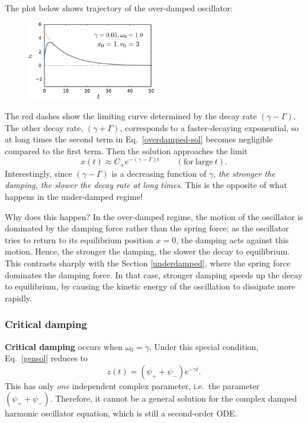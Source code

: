 \documentclass[10pt,a4paper]{article}
\begin{document}
\clearpage
The plot below shows trajectory of the over-damped oscillator:

\begin{figure}[ht]
  \centering\includegraphics[width=0.5\textwidth]{overdamped}
\end{figure}

\noindent
The red dashes show the limiting curve determined by the decay rate
$(\gamma - \Gamma)$.  The other decay rate, $(\gamma + \Gamma)$,
corresponds to a faster-decaying exponential, so at long times the
second term in Eq.~\eqref{overdamped-sol} becomes negligible compared
to the first term. Then the solution approaches the limit
\begin{equation}
x(t) \approx C_+ e^{-(\gamma - \Gamma) t} \qquad (\mathrm{for}~\mathrm{large}~t).
\label{overdamped-long-t}
\end{equation}
Interestingly, since $(\gamma-\Gamma)$ is a decreasing function of
$\gamma$, \emph{the stronger the damping, the slower the decay rate at
  long times}. This is the opposite of what happens in the
under-damped regime!

Why does this happen? In the over-damped regime, the motion of the
oscillator is dominated by the damping force rather than the spring
force; as the oscillator tries to return to its equilibrium position
$x = 0$, the damping acts against this motion. Hence, the stronger the
damping, the slower the decay to equilibrium. This contrasts sharply
with the Section \ref{underdamped}, where the spring force dominates the
damping force. In that case, stronger damping speeds up the decay to
equilibrium, by causing the kinetic energy of the oscillation to
dissipate more rapidly.

\subsubsection{Critical damping}
\label{critical-damping}

\textbf{Critical damping} occurs when $\omega_0 = \gamma$. Under this
special condition, Eq.~\eqref{gensol} reduces to
\begin{equation}
z(t) = \left(\psi_+ + \psi_-\right) e^{-\gamma t}.
\end{equation}
This has only \emph{one} independent complex parameter, i.e.~the
parameter $(\psi_+ + \psi_-)$. Therefore, it cannot be a general
solution for the complex damped harmonic oscillator equation, which is
still a second-order ODE.
\end{document}

